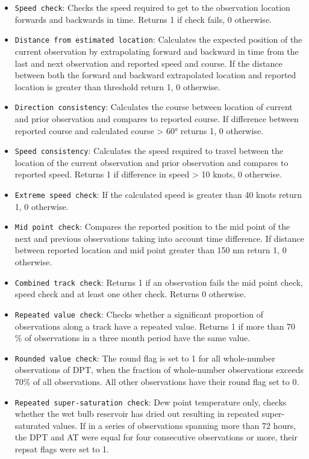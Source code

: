 \begin{itemize}[resume]
\item \texttt{Speed check}: Checks the speed required to get to the observation location forwards and backwards in time. Returns 1 if check fails, 0 otherwise.
\item \texttt{Distance from estimated location}: Calculates the expected position of the current observation by extrapolating forward and backward in time from the last and next observation and reported speed and course. If the distance between both the forward and backward extrapolated location and reported location is greater than threshold return 1, 0 otherwise.
\item \texttt{Direction consistency}: Calculates the course between location of current and prior observation and compares to reported course. If difference between reported course and calculated course > 60° returns 1, 0 otherwise.
\item \texttt{Speed consistency}: Calculates the speed required to travel between the location of the current observation and prior observation and compares to reported speed. Returns 1 if difference in speed > 10 knots, 0 otherwise.
\item \texttt{Extreme speed check}: If the calculated speed is greater than 40 knots return 1, 0 otherwise.
\item \texttt{Mid point check}: Compares the reported position to the mid point of the next and previous observations taking into account time difference. If distance between reported location and mid point greater than 150 nm return 1, 0 otherwise.
\item \texttt{Combined track check}: Returns 1 if an observation fails the mid point check, speed check and at least one other check. Returns 0 otherwise.
\item \texttt{Repeated value check}: Checks whether a significant proportion of observations along a track have a repeated value. Returns 1 if more than 70 \% of observations in a three month period have the same value.
\item \texttt{Rounded value check}: The round flag is set to 1 for all whole-number observations of DPT, when the fraction of whole-number observations exceeds 70\% of all observations. All other observations have their round flag set to 0.
\item \texttt{Repeated super-saturation check}: Dew point temperature only, checks whether the wet bulb reservoir has dried out resulting in repeated super-saturated values. If in a series of observations spanning more than 72 hours, the DPT and AT were equal for four consecutive observations or more, their repsat flags were set to 1.

\end{itemize}
